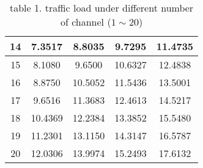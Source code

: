 \begin{table}[H]
\begin{center}
\begin{tabular}{|c|c|c|c|c|}
            \hline
            14 & 7.3517 & 8.8035 & 9.7295 & 11.4735 \\
            \hline
            15 & 8.1080 & 9.6500 & 10.6327 & 12.4838 \\
            \hline
            16 & 8.8750 & 10.5052 & 11.5436 & 13.5001 \\
            \hline
            17 & 9.6516 & 11.3683 & 12.4613 & 14.5217 \\
            \hline
            18 & 10.4369 & 12.2384 & 13.3852 & 15.5480 \\
            \hline
            19 & 11.2301 & 13.1150 & 14.3147 & 16.5787 \\
            \hline
            20 & 12.0306 & 13.9974 & 15.2493 & 17.6132 \\
            \hline
        \end{tabular}
        \caption{table 1. traffic load under different number of channel ($1 \sim 20$)}
    \end{center}
\end{table}

